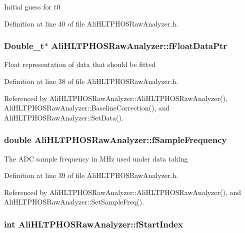 Initial guess for t0 

Definition at line 40 of file Ali\-HLTPHOSRaw\-Analyzer.h.
\subsubsection{\setlength{\rightskip}{0pt plus 5cm}Double\_\-t$\ast$ {\bf Ali\-HLTPHOSRaw\-Analyzer::f\-Float\-Data\-Ptr}\hspace{0.3cm}{\tt  [protected, inherited]}}\label{classAliHLTPHOSRawAnalyzer_AliHLTPHOSRawAnalyzerPeakFinderp0}


Float representation of data that should be fitted 

Definition at line 38 of file Ali\-HLTPHOSRaw\-Analyzer.h.

Referenced by Ali\-HLTPHOSRaw\-Analyzer::Ali\-HLTPHOSRaw\-Analyzer(), Ali\-HLTPHOSRaw\-Analyzer::Baseline\-Correction(), and Ali\-HLTPHOSRaw\-Analyzer::Set\-Data().
\subsubsection{\setlength{\rightskip}{0pt plus 5cm}double {\bf Ali\-HLTPHOSRaw\-Analyzer::f\-Sample\-Frequency}\hspace{0.3cm}{\tt  [protected, inherited]}}\label{classAliHLTPHOSRawAnalyzer_AliHLTPHOSRawAnalyzerPeakFinderp1}


The ADC sample frequency in MHz used under data taking 

Definition at line 39 of file Ali\-HLTPHOSRaw\-Analyzer.h.

Referenced by Ali\-HLTPHOSRaw\-Analyzer::Ali\-HLTPHOSRaw\-Analyzer(), and Ali\-HLTPHOSRaw\-Analyzer::Set\-Sample\-Freq().
\subsubsection{\setlength{\rightskip}{0pt plus 5cm}int {\bf Ali\-HLTPHOSRaw\-Analyzer::f\-Start\-Index}\hspace{0.3cm}{\tt  [protected, inherited]}}\label{classAliHLTPHOSRawAnalyzer_AliHLTPHOSRawAnalyzerPeakFinderp7}




